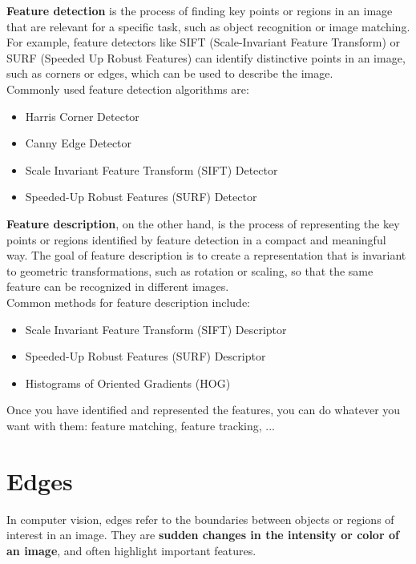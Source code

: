 \documentclass{article}
\begin{document}
\textbf{Feature detection} is the process of finding key points or regions in an image that are relevant for a specific task, such as object recognition or image matching. For example, feature detectors like SIFT (Scale-Invariant Feature Transform) or SURF (Speeded Up Robust Features) can identify distinctive points in an image, such as corners or edges, which can be used to describe the image. \\

Commonly used feature detection algorithms are:
\begin{itemize}
    \item Harris Corner Detector
    \item Canny Edge Detector
    \item Scale Invariant Feature Transform (SIFT) Detector
    \item Speeded-Up Robust Features (SURF) Detector
\end{itemize}

\textbf{Feature description}, on the other hand, is the process of representing the key points or regions identified by feature detection in a compact and meaningful way. The goal of feature description is to create a representation that is invariant to geometric transformations, such as rotation or scaling, so that the same feature can be recognized in different images. \\ 

Common methods for feature description include:
\begin{itemize}
    \item Scale Invariant Feature Transform (SIFT) Descriptor
    \item Speeded-Up Robust Features (SURF) Descriptor
    \item Histograms of Oriented Gradients (HOG) 
\end{itemize}

Once you have identified and represented the features, you can do whatever you want with them:
feature matching, feature tracking, ...

\newpage

\section*{Edges}

In computer vision, edges refer to the boundaries between objects or regions of interest in an image. They are \textbf{sudden changes in the intensity or color of an image}, and often highlight important features.
\end{document}
